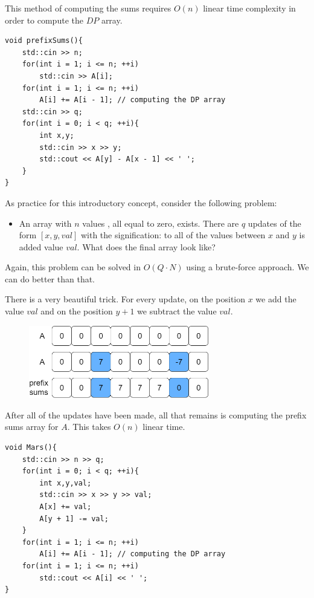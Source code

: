 \documentclass[letterpaper]{article}
\begin{document}
This method of computing the sums requires $O(n)$ linear time complexity in order to compute the $DP$ array.

\begin{lstlisting}
void prefixSums(){
    std::cin >> n;
    for(int i = 1; i <= n; ++i)
        std::cin >> A[i];
    for(int i = 1; i <= n; ++i)
        A[i] += A[i - 1]; // computing the DP array
    std::cin >> q;
    for(int i = 0; i < q; ++i){
        int x,y;
        std::cin >> x >> y;
        std::cout << A[y] - A[x - 1] << ' ';
    }
}
\end{lstlisting}

As practice for this introductory concept, consider the following problem:

\begin{itemize}
    \item An array with $n$ values , all equal to zero, exists. There are $q$ updates of the form $[x, y, val]$ with the signification: to all of the values between $x$ and $y$ is added value $val$. What does the final array look like?
\end{itemize}

Again, this problem can be solved in $O(Q \cdot N)$ using a brute-force approach. We can do better than that.

There is a very beautiful trick. For every update, on the position $x$ we add the value $val$ and on the position $y + 1$ we subtract the value $val$.

\begin{figure} [h!]
\centering
\includegraphics[width=0.7\textwidth]{pngOfDiagrams/prefixsum4.png}
\end{figure}

After all of the updates have been made, all that remains is computing the prefix sums array for $A$. This takes $O(n)$ linear time.

\begin{lstlisting}
void Mars(){
    std::cin >> n >> q;
    for(int i = 0; i < q; ++i){
        int x,y,val;
        std::cin >> x >> y >> val;
        A[x] += val;
        A[y + 1] -= val;
    }
    for(int i = 1; i <= n; ++i)
        A[i] += A[i - 1]; // computing the DP array
    for(int i = 1; i <= n; ++i)
        std::cout << A[i] << ' ';
}
\end{lstlisting}
\end{document}
